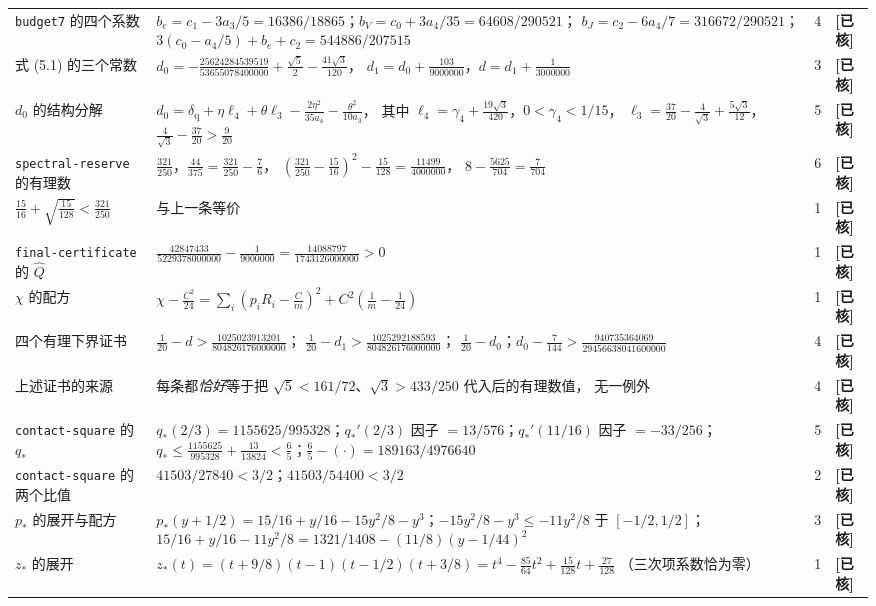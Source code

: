 \documentclass[UTF8,11pt]{ctexart}
\theoremstyle{definition}
\newcommand{\chk}{\textcolor[rgb]{0.05,0.25,0.55}{\bfseries [已核]}}
\begin{document}
\begin{longtable}{@{}p{}p{}cp{}@{}}
\texttt{budget7} 的四个系数 & $b_e=c_1-3a_3/5=16386/18865$；$b_V=c_0+3a_4/35=64608/290521$；
 $b_J=c_2-6a_4/7=316672/290521$；$3(c_0-a_4/5)+b_e+c_2=544886/207515$ & 4 & \chk\\
式 (5.1) 的三个常数 & $d_0=-\frac{25624284539519}{53655078400000}+\frac{\sqrt5}2-\frac{41\sqrt3}{120}$，
 $d_1=d_0+\frac{103}{9000000}$，$d=d_1+\frac1{3000000}$ & 3 & \chk\\
$d_0$ 的结构分解 &
 $d_0=\delta_{\mathrm q}+\eta\ell_4+\theta\ell_3-\frac{2\eta^2}{35a_4}-\frac{\theta^2}{10a_3}$，
 其中 $\ell_4=\gamma_4+\frac{19\sqrt3}{420}$，$0<\gamma_4<1/15$，
 $\ell_3=\frac{37}{20}-\frac4{\sqrt3}+\frac{5\sqrt3}{12}$，$\frac4{\sqrt3}-\frac{37}{20}>\frac9{20}$ & 5 & \chk\\
\texttt{spectral-reserve} 的有理数 &
 $\frac{321}{250}$，$\frac{44}{375}=\frac{321}{250}-\frac76$，
 $(\frac{321}{250}-\frac{15}{16})^2-\frac{15}{128}=\frac{11499}{4000000}$，
 $8-\frac{5625}{704}=\frac7{704}$ & 6 & \chk\\
$\frac{15}{16}+\sqrt{\frac{15}{128}}<\frac{321}{250}$ & 与上一条等价 & 1 & \chk\\
\texttt{final-certificate} 的 $\widehat Q$ &
 $\frac{42847433}{5229378000000}-\frac1{9000000}=\frac{14088797}{1743126000000}>0$ & 1 & \chk\\
$\chi$ 的配方 &
 $\chi-\frac{C^2}{24}=\sum_i(p_iR_i-\frac Cm)^2+C^2(\frac1m-\frac1{24})$ & 1 & \chk\\
四个有理下界证书 &
 $\frac1{20}-d>\frac{1025023913201}{804826176000000}$；
 $\frac1{20}-d_1>\frac{1025292188593}{804826176000000}$；
 $\frac1{20}-d_0$；$d_0-\frac7{144}>\frac{940735364069}{29456638041600000}$ & 4 & \chk\\
上述证书的来源 & 每条都\emph{恰好}等于把 $\sqrt5<161/72$、$\sqrt3>433/250$ 代入后的有理数值，
 无一例外 & 4 & \chk\\
\texttt{contact-square} 的 $q_*$ &
 $q_*(2/3)=1155625/995328$；$q_*'(2/3)$ 因子 $=13/576$；$q_*'(11/16)$ 因子 $=-33/256$；
 $q_*\le\frac{1155625}{995328}+\frac{13}{13824}<\frac65$；$\frac65-(\cdot)=189163/4976640$ & 5 & \chk\\
\texttt{contact-square} 的两个比值 &
 $41503/27840<3/2$；$41503/54400<3/2$ & 2 & \chk\\
$p_*$ 的展开与配方 &
 $p_*(y+1/2)=15/16+y/16-15y^2/8-y^3$；$-15y^2/8-y^3\le-11y^2/8$ 于 $[-1/2,1/2]$；
 $15/16+y/16-11y^2/8=1321/1408-(11/8)(y-1/44)^2$ & 3 & \chk\\
$z_*$ 的展开 & $z_*(t)=(t+9/8)(t-1)(t-1/2)(t+3/8)=t^4-\frac{85}{64}t^2+\frac{15}{128}t+\frac{27}{128}$
 （三次项系数恰为零） & 1 & \chk\\

\end{longtable}
\end{document}
